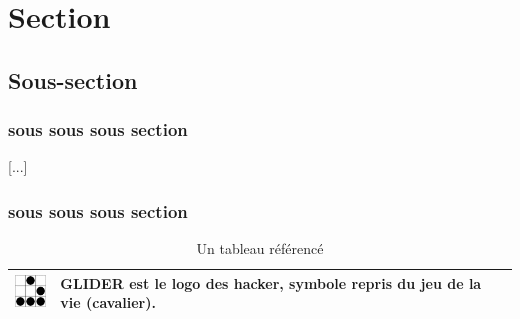 \documentclass[11pt,twoside,a4paper]{article}
\begin{document}


\clearpage


\section{Section}



\subsection{Sous-section}



\subsubsection{sous sous sous section}

[...]~\\

\subsubsection{sous sous sous section}


\begin{table}[ht]

	\begin{center}

		\begin{tabular}{|p{}|p{}|}

		\hline

			\includegraphics[width=1cm]{img/logo_glider.png}
			& 
			\textbf{GLIDER} est le logo des hacker, symbole repris du jeu de la vie (cavalier). \\

		\hline

		\end{tabular}

	\end{center}

	\caption{Un tableau r{\'e}f{\'e}renc{\'e}}

	\label{tab:TabReference01}

\end{table}~\\
\end{document}
